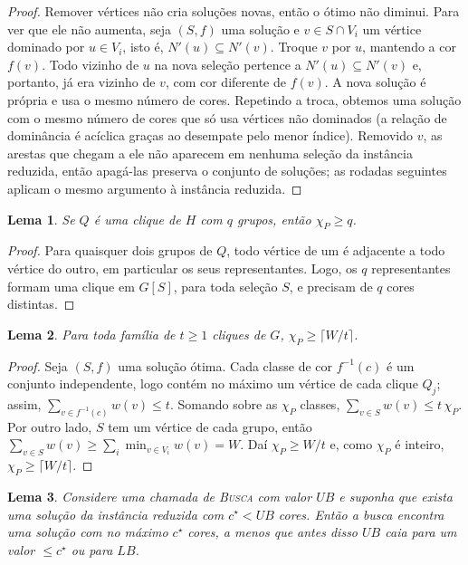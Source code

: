 \documentclass[12pt]{article}
\newtheorem{lema}{Lema}
\newcommand{\chiP}{\chi_P}
\newcommand{\LB}{\mathit{LB}}
\newcommand{\UB}{\mathit{UB}}
\begin{document}
\begin{proof}
  Remover vértices não cria soluções novas, então o ótimo não diminui. Para
  ver que ele não aumenta, seja $(S,f)$ uma solução e $v\in S\cap V_i$ um
  vértice dominado por $u\in V_i$, isto é, $N'(u)\subseteq N'(v)$. Troque $v$
  por $u$, mantendo a cor $f(v)$. Todo vizinho de $u$ na nova seleção pertence
  a $N'(u)\subseteq N'(v)$ e, portanto, já era vizinho de $v$, com cor
  diferente de $f(v)$. A nova solução é própria e usa o mesmo número de cores.
  Repetindo a troca, obtemos uma solução com o mesmo número de cores que só
  usa vértices não dominados (a relação de dominância é acíclica graças ao
  desempate pelo menor índice). Removido $v$, as arestas que chegam a ele não
  aparecem em nenhuma seleção da instância reduzida, então apagá-las preserva
  o conjunto de soluções; as rodadas seguintes aplicam o mesmo argumento à
  instância reduzida.
\end{proof}

\begin{lema}\label{lem:clique}
  Se $Q$ é uma clique de $H$ com $q$ grupos, então $\chiP\ge q$.
\end{lema}

\begin{proof}
  Para quaisquer dois grupos de $Q$, todo vértice de um é adjacente a todo
  vértice do outro, em particular os seus representantes. Logo, os $q$
  representantes formam uma clique em $G[S]$, para toda seleção $S$, e
  precisam de $q$ cores distintas.
\end{proof}

\begin{lema}\label{lem:cobertura}
  Para toda família de $t\ge1$ cliques de $G$, $\chiP\ge\lceil W/t\rceil$.
\end{lema}

\begin{proof}
  Seja $(S,f)$ uma solução ótima. Cada classe de cor $f^{-1}(c)$ é um
  conjunto independente, logo contém no máximo um vértice de cada clique
  $Q_j$; assim, $\sum_{v\in f^{-1}(c)}w(v)\le t$. Somando sobre as $\chiP$
  classes, $\sum_{v\in S}w(v)\le t\,\chiP$. Por outro lado, $S$ tem um vértice
  de cada grupo, então $\sum_{v\in S}w(v)\ge\sum_i\min_{v\in V_i}w(v)=W$.
  Daí $\chiP\ge W/t$ e, como $\chiP$ é inteiro, $\chiP\ge\lceil W/t\rceil$.
\end{proof}

\begin{lema}\label{lem:caminho}
  Considere uma chamada de \textsc{Busca} com valor $\UB$ e suponha que exista
  uma solução da instância reduzida com $c^\star<\UB$ cores. Então a busca
  encontra uma solução com no máximo $c^\star$ cores, a menos que antes disso
  $\UB$ caia para um valor $\le c^\star$ ou para $\LB$.
\end{lema}
\end{document}
